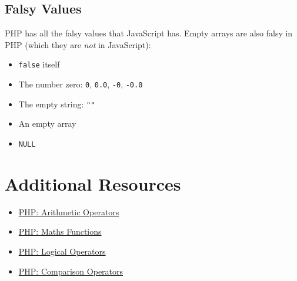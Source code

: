\subsection{Falsy Values}

PHP has all the falsy values that JavaScript has. Empty arrays are also falsy in PHP (which they are \textit{not} in JavaScript):

\begin{itemize}
    \item \texttt{false} itself
    \item The number zero: \texttt{0}, \texttt{0.0}, \texttt{-0}, \texttt{-0.0}
    \item The empty string: \texttt{""}
    \item An empty array
    \item \texttt{NULL}
\end{itemize}



\section{Additional Resources}

\begin{itemize}[leftmargin=*]
    \item \href{https://www.php.net/manual/en/language.operators.arithmetic.php}{PHP: Arithmetic Operators}
    \item \href{https://www.php.net/manual/en/ref.math.php}{PHP: Maths Functions}
    \item \href{http://php.net/manual/en/language.operators.logical.php}{PHP: Logical Operators}
    \item \href{http://php.net/manual/en/language.operators.comparison.php}{PHP: Comparison Operators}
\end{itemize}
